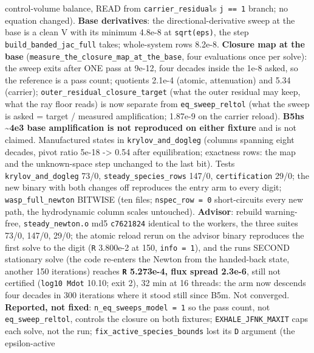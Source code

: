 \documentclass[english,a4paper]{my_memo}
\begin{document}
\begin{itemize}
  control-volume balance, READ from \texttt{carrier\_residual}\textquotesingle s \texttt{j\ ==\ 1} branch;
  no equation changed). \textbf{Base derivatives}: the directional-derivative
  sweep at the base is a clean V with its minimum 4.8e-8 at \texttt{sqrt(eps)},
  the step \texttt{build\_banded\_jac\_full} takes; whole-system rows 8.2e-8.
  \textbf{Closure map at the base} (\texttt{measure\_the\_closure\_map\_at\_the\_base}, four
  evaluations once per solve): the sweep exits after ONE pass at 9e-12,
  four decades inside the 1e-8 asked, so the reference is a pass count;
  quotients 2.1e-4 (atomic, attenuation) and 5.34 (carrier);
  \texttt{outer\_residual\_closure\_target} (what the outer residual may keep, what
  the ray floor reads) is now separate from \texttt{eq\_sweep\_reltol} (what the
  sweep is asked = target / measured amplification; 1.87e-9 on the carrier
  reload). \textbf{B5h\textquotesingle s \textasciitilde4e3 base amplification is not reproduced on either
  fixture} and is not claimed. Manufactured states in \texttt{krylov\_and\_dogleg}
  (columns spanning eight decades, pivot ratio 5e-18 -\textgreater{} 0.54 after
  equilibration; exactness rows: the map and the unknown-space step
  unchanged to the last bit). Tests \texttt{krylov\_and\_dogleg} 73/0,
  \texttt{steady\_species\_rows} 147/0, \texttt{certification} 29/0; the new binary with
  both changes off reproduces the entry arm to every digit;
  \texttt{wasp\_full\_newton} BITWISE (ten files; \texttt{nspec\_row\ =\ 0} short-circuits
  every new path, the hydrodynamic column scales untouched). \textbf{Advisor}:
  rebuild warning-free, \texttt{steady\_newton.o} md5 \texttt{c7621824} identical to the
  worker\textquotesingle s, the three suites 73/0, 147/0, 29/0; the atomic reload rerun on
  the advisor binary reproduces the first solve to the digit (\texttt{\textbar{}\textbar{}R\textbar{}\textbar{}}
  3.800e-2 at 150, \texttt{info\ =\ 1}), and the run\textquotesingle s SECOND stationary solve (the
  code re-enters the Newton from the handed-back state, another 150
  iterations) reaches \textbf{\texttt{\textbar{}\textbar{}R\textbar{}\textbar{}} 5.273e-4, flux spread 2.3e-6}, still not
  certified (\texttt{log10\ Mdot} 10.10; exit 2), 32 min at 16 threads: the arm now
  descends four decades in 300 iterations where it stood still since B5m.
  Not converged. \textbf{Reported, not fixed}: \texttt{n\_eq\_sweeps\_model\ =\ 1} so the
  pass count, not \texttt{eq\_sweep\_reltol}, controls the closure on both
  fixtures; \texttt{EXHALE\_JFNK\_MAXIT} caps each solve, not the run;
  \texttt{fix\_active\_species\_bounds} lost its \texttt{D} argument (the epsilon-active

\end{itemize}
\end{document}
